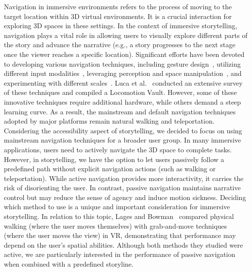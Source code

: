 {Navigation in immersive environments refers to the process of moving to the target location within 3D virtual environments. It is a crucial interaction for exploring 3D spaces in these settings. In the context of immersive storytelling, navigation plays a vital role in allowing users to visually explore different parts of the story and advance the narrative (e.g., a story progresses to the next stage once the viewer reaches a specific location).
Significant efforts have been devoted to developing various navigation techniques, including gesture design~\cite{tursunov2024creating}, utilizing different input modalities~\cite{swidrak2024beyond}, leveraging perception and space manipulation~\cite{dong2021tailored}, and experimenting with different scales~\cite{mirhosseini2019exploration, abtahi2019m}. 
Luca et al.~\cite{di2021locomotion} conducted an extensive survey of these techniques and compiled a Locomotion Vault. However, some of these innovative techniques require additional hardware, while others demand a steep learning curve.
As a result, the mainstream and default navigation techniques adopted by major platforms remain natural walking and teleportation. Considering the accessibility aspect of storytelling, we decided to focus on using mainstream navigation techniques for a broader user group. In many immersive applications, users need to actively navigate the 3D space to complete tasks. However, in storytelling, we have the option to let users passively follow a predefined path without explicit navigation actions (such as walking or teleportation).
While active navigation provides more interactivity, it carries the risk of disorienting the user. In contrast, passive navigation maintains narrative control but may reduce the sense of agency and induce motion sickness. Deciding which method to use is a unique and important consideration for immersive storytelling.
In relation to this topic, Lages and Bowman~\cite{lages2018move} compared physical walking (where the user moves themselves) with grab-and-move techniques (where the user moves the view) in VR, demonstrating that performance may depend on the user's spatial abilities. Although both methods they studied were active, we are particularly interested in the performance of passive navigation when combined with a predefined storyline.}

